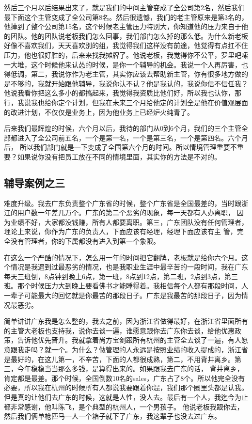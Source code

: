 \documentclass[12pt]{article}
\begin{document}
然后三个月以后结果出来了，就是我们的中间主管变成了全公司第2名，然后我们最下面这个主管变成了全公司第8名。然后很遗憾，我们的老主管原来是第3名的，他掉到了整个公司第15名，这个时候老主管压力特别大，你知道他的压力来自于他的团队。他的团队说老板我们怎么回事，我们部门怎么掉的那么低。为什么新老板好像不喜欢我们，天天喜欢别的组，我觉得我们这样没有前途，他觉得有点扛不住压力，他也很好胜的，后来来找我摊牌了。他说老板，我觉得你不公平，罗里吧嗦一大堆，这个时候他来认怂的时候，是你一个辅导的机会。我说一个人再厉害，也得低调，第二，我说你作为老主管，其实你应该去帮助新主管，你有很多地方做的是不够的，我就开始跟他辅导，我说你认不认？他是我认的，我说你信不信任我？他说我看你把这么多小的都搞起来，我觉得我资质比他们好，所以我也认你，那行，我说我也给你定个计划，但我在未来三个月给他定的计划全是他在价值观层面的改进计划，不仅仅是业务上，因为他业务上已经炉火纯青了。

后来我们最辉煌的时候，六个月以后，我待的部门从0到6个月，我们的三个主管全部都进入了全公司前五名，一个是第一名，一个是第三名，一个是第四名。六个月后， 所以我们部门就是一下变成了全国第六个月的时间。所以情境管理重要不重要？如果说你没有把员工放在不同的情境里面，其实你的方法是不对的。

\subsection{辅导案例之三}
难度升级。我去广东负责整个广东省的时候，整个广东省是全国最差的，当时跟浙江的用户数一年差几万个。广东的第二个恶劣的现象，每一天都有人办离职， 因为业绩不好，大家都没钱赚，所有人都要离职。第三，广东团队没有任何管理者，理论上来说，你作为广东的负责人，下面应该有经理，经理下面应该有主 管，完全没有管理者，你的下属都没有进入到第一个象限。

在这么一个严酷的情况下，怎么用一年的时间把它翻牌，老板就是给你六个月。这个情况是我遇到过最恶劣的情况，也是我职业生涯中最辛苦的一段时间，我在广东每天三班倒，8点钟到晚上6点，第一班，8点到12点，第二班，2点到3点，第三班。那个时候压力大到晚上要看佛书才能睡得着。我相信每个人都有那段时间，人一辈子可能最大的回忆就是你最苦的那段日子。广东是我最苦的那段日子，因为情况最恶劣。

简单讲讲广东我是怎么整的，我去之前，因为浙江省做得最好，在浙江省里面所有的主管大老板也支持我，说你去谈一遍，谁愿意跟你去广东你去谈，给他优惠政策，告诉他优先晋升。我就拿着尚方宝剑跟所有杭州的主管全去谈了一遍，有人愿意跟我走吗？就一个。为什么？做管理的人永远是按照业绩的收入提成的，浙江省是最好的，在这儿第一，不辛苦，下面的人都很成熟，第二，不用背井离乡。第三，今年稳稳当当那么多钱，是算得出来的。如果跟我去广东的话， 背井离乡，肯定都是最差。那个时候，全国倒数10名的sales，广东占了8个。所以他完全没有必要，所以我在杭州的时候所有人都说我要跟着你混，我们那个圈里头都是认我。 但是真的让他们去广东的时候，这就是人性，没人去。最后有一个人，我迄今为止都非常感谢，他叫陈飞，是个典型的杭州人，一个男孩子。 他说老板我跟你去，然后我们俩单枪匹马一人一个箱子就下了广东，我这辈子也没去过广东。
\end{document}
